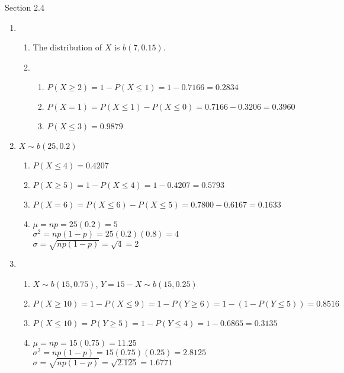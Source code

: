 \documentclass{article}
\begin{document}
    Section 2.4
    \begin{enumerate}
     \addtocounter{enumi}{3}
     \item 
      \begin{enumerate}
       \item The distribution of $X$ is $b(7, 0.15)$.
       \item
	\begin{enumerate}
	 \item $P(X \ge 2) = 1 - P(X \le 1) = 1 - 0.7166 = 0.2834$
	 \item $P(X = 1) = P(X \le 1) - P(X \le 0) = 0.7166 - 0.3206 = 0.3960$
	 \item $P(X \le 3) = 0.9879$
	\end{enumerate}
      \end{enumerate}
	
     \newpage
     \item
      $X \sim b(25,0.2)$
      \begin{enumerate}
       \item 
	$P(X \le 4) = 0.4207$
       \item
	$P(X \ge 5) = 1 - P(X \le 4) = 1 - 0.4207 = 0.5793$
       \item
	$P(X = 6) = P(X \le 6) - P(X \le 5) = 0.7800 - 0.6167 = 0.1633$
       \item
	$\mu = np = 25(0.2) = 5$ \\
	$\sigma^2 = np(1-p) = 25(0.2)(0.8) = 4$ \\
	$\sigma = \sqrt{np(1-p)} = \sqrt{4} = 2$\\
      \end{enumerate}

     \item
      \begin{enumerate}
       \item $X \sim b(15,0.75)$, $Y = 15 - X \sim b(15,0.25)$
       \item 
	$P(X \ge 10) = 1 - P(X \le 9) = 1 - P(Y \ge 6) = 1 - (1 - P(Y \le 5)) = 0.8516$
       \item
	$P(X \le 10) = P(Y \ge 5) = 1 - P(Y \le 4) = 1 - 0.6865 = 0.3135$
       \item
	$\mu = np = 15(0.75) = 11.25$ \\
	$\sigma^2 = np(1-p) = 15(0.75)(0.25) = 2.8125$ \\
	$\sigma = \sqrt{np(1-p)} = \sqrt{2.125} = 1.6771$
      \end{enumerate}
     \addtocounter{enumi}{1}
      

\end{enumerate}
\end{document}
